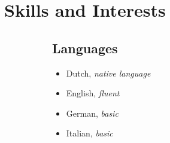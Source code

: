 \documentclass[11pt]{article}
\begin{document}
	\section*{Skills and Interests}
	\begin{figure}[h]
		\begin{subfigure}[t]{0.5\textwidth}
			\subsection*{Languages}
			\begin{itemize}[noitemsep, nolistsep]
				\item Dutch, \textit{native language}
				\item English, \textit{fluent}
				\item German, \textit{basic}
				\item Italian, \textit{basic}
			\end{itemize}
		\end{subfigure}
		\begin{subfigure}[t]{0.5\textwidth}

\end{subfigure}
\end{figure}
\end{document}
